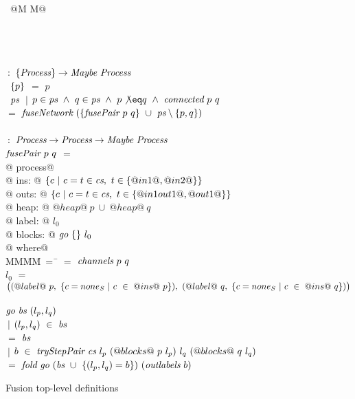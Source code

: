 \begin{figure}

\begin{tabbing}
~@M M@   \TABDEF \kill

 \\
 \\
\\
 \> $~:$ \> $\{ \textit{Process} \} \to  \textit{Maybe}~\textit{Process}$ \\
~$\{ p \}$ \> $=$ \> $p$ \\
~$\textit{ps}$
    \> $~|$      \> $p \in \ti{ps} ~\wedge~ q \in \ti{ps} ~\wedge~ p \not\eq q ~\wedge~ \ti{connected}~p~q$ \\
    \> $=$ \> $\textit{fuseNetwork}~(\{ \textit{fusePair}~p~q \}~\cup~\textit{ps} \setminus \{ p,q \})$ \\
\\
 \> $~:$ \> $\textit{Process} \to \textit{Process} \to  \textit{Maybe}~\textit{Process}$ \\
$\textit{fusePair}~p~q$ \> $=$ \\
@    process@ \\
@        ins: @ $\{ c~|~c=t \in \textit{cs},~t \in \{ @in1@,@in2@ \} \} $ \\
@       outs: @ $\{ c~|~c=t \in \textit{cs},~t \in \{ @in1out1@,@out1@ \} \} $ \\
@       heap: @ $@heap@~p~\cup~@heap@~q$ \\
@      label: @ $l_0$ \\
@     blocks: @ $\textit{go}~\{  \}~l_0$ \\
@ where@ \\
MM\=MM\=~=~\=\kill
 \> \cs \> $=$ \> $\textit{channels}~p~q$ \\
 \> $l_0$   \> $=$ \> $
      \big( 
      (@label@~p,~\{ c=none_S~|~c~\in~@ins@~p \}),~
      (@label@~q,~\{ c=none_S~|~c~\in~@ins@~q \})
      \big)$ \\
 \\
 \> $\textit{go}~\textit{bs}~(l_p,l_q)$ \\
 \> \> $~|$ \> $(l_p,l_q)~\in~\textit{bs}$ \\
 \> \> $=$  \> $\textit{bs}$ \\
 \> \> $~|$ \>
        $b~\in~\textit{tryStepPair}~\textit{cs}~l_p~(@blocks@~p~l_p)~l_q~(@blocks@~q~l_q)$ \\ 
 \> \> $=$ \> $\textit{fold}~\textit{go}~(\textit{bs}~\cup~\{ (l_p,l_q)=b \})~(\textit{outlabels}~b)$ \\
\end{tabbing}
\caption{Fusion top-level definitions}
\label{fig:Fusion:Def:Top}
\end{figure}


